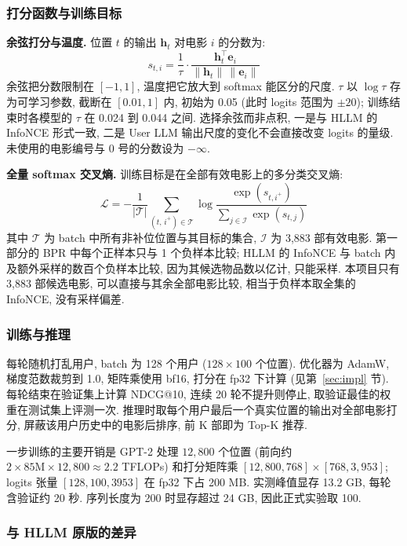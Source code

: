 \documentclass{article}
\begin{document}
\subsubsection{打分函数与训练目标}

\textbf{余弦打分与温度.} 位置 $t$ 的输出 $\mathbf{h}_t$ 对电影 $i$ 的分数为:
\[
s_{t,i} = \frac{1}{\tau}\cdot\frac{\mathbf{h}_t^\top\mathbf{e}_i}{\lVert\mathbf{h}_t\rVert\,\lVert\mathbf{e}_i\rVert}
\]
余弦把分数限制在 $[-1, 1]$, 温度把它放大到 softmax 能区分的尺度. $\tau$ 以 $\log\tau$ 存为可学习参数, 截断在 $[0.01, 1]$ 内, 初始为 0.05 (此时 logits 范围为 $\pm 20$); 训练结束时各模型的 $\tau$ 在 0.024 到 0.044 之间. 选择余弦而非点积, 一是与 HLLM 的 InfoNCE 形式一致, 二是 User LLM 输出尺度的变化不会直接改变 logits 的量级. 未使用的电影编号与 0 号的分数设为 $-\infty$.

\textbf{全量 softmax 交叉熵.} 训练目标是在全部有效电影上的多分类交叉熵:
\[
\mathcal{L} = -\frac{1}{|\mathcal{T}|}\sum_{(t,\,i^+)\in\mathcal{T}}\log\frac{\exp(s_{t,i^+})}{\sum_{j\in\mathcal{I}}\exp(s_{t,j})}
\]
其中 $\mathcal{T}$ 为 batch 中所有非补位位置与其目标的集合, $\mathcal{I}$ 为 3,883 部有效电影. 第一部分的 BPR 中每个正样本只与 1 个负样本比较; HLLM 的 InfoNCE 与 batch 内及额外采样的数百个负样本比较, 因为其候选物品数以亿计, 只能采样. 本项目只有 3,883 部候选电影, 可以直接与其余全部电影比较, 相当于负样本取全集的 InfoNCE, 没有采样偏差.

\subsubsection{训练与推理}

每轮随机打乱用户, batch 为 128 个用户 ($128\times 100$ 个位置). 优化器为 AdamW, 梯度范数裁剪到 1.0, 矩阵乘使用 bf16, 打分在 fp32 下计算 (见第~\ref{sec:impl} 节). 每轮结束在验证集上计算 NDCG@10, 连续 20 轮不提升则停止, 取验证最佳的权重在测试集上评测一次. 推理时取每个用户最后一个真实位置的输出对全部电影打分, 屏蔽该用户历史中的电影后排序, 前 K 部即为 Top-K 推荐.

一步训练的主要开销是 GPT-2 处理 $12{,}800$ 个位置 (前向约 $2\times 85\mathrm{M}\times 12{,}800\approx 2.2$ TFLOPs) 和打分矩阵乘 $[12{,}800, 768]\times[768, 3{,}953]$; logits 张量 $[128, 100, 3953]$ 在 fp32 下占 200 MB. 实测峰值显存 13.2 GB, 每轮含验证约 20 秒. 序列长度为 200 时显存超过 24 GB, 因此正式实验取 100.

\subsubsection{与 HLLM 原版的差异}
\end{document}
